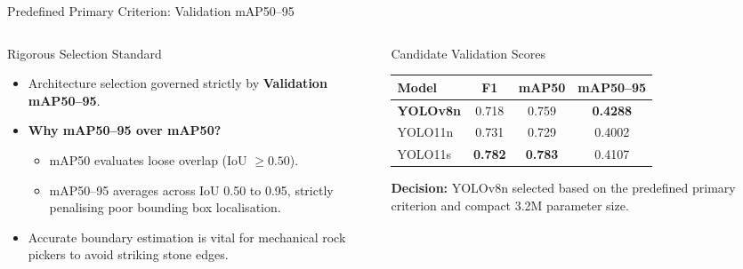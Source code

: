 \documentclass[aspectratio=169,10pt]{beamer}
\begin{document}
\begin{frame}{Predefined Primary Criterion: Validation mAP50–95}
\begin{columns}[T]
  \begin{column}{0.48\textwidth}
    \begin{block}{\small Rigorous Selection Standard}
      \small
      \begin{itemize}
        \item Architecture selection governed strictly by \textbf{Validation mAP50--95}.
        \item \textbf{Why mAP50--95 over mAP50?}
        \begin{itemize}
          \item mAP50 evaluates loose overlap (IoU $\ge 0.50$).
          \item mAP50--95 averages across IoU 0.50 to 0.95, strictly penalising poor bounding box localisation.
        \end{itemize}
        \item Accurate boundary estimation is vital for mechanical rock pickers to avoid striking stone edges.
      \end{itemize}
    \end{block}
  \end{column}
  \begin{column}{0.48\textwidth}
    \begin{block}{\small Candidate Validation Scores}
      \small
      \begin{table}
        \centering
        \footnotesize
        \begin{tabular}{|l|c|c|c|}
          \hline
          Model & F1 & mAP50 & mAP50--95 \\
          \hline
          \textbf{YOLOv8n} & 0.718 & 0.759 & \textbf{0.4288} \\
          \hline
          YOLO11n & 0.731 & 0.729 & 0.4002 \\
          \hline
          YOLO11s & \textbf{0.782} & \textbf{0.783} & 0.4107 \\
          \hline
        \end{tabular}
      \end{table}
      \vspace{-4pt}
      \textbf{Decision:} YOLOv8n selected based on the predefined primary criterion and compact 3.2M parameter size.
    \end{block}
  \end{column}
\end{columns}
\end{frame}
\end{document}
